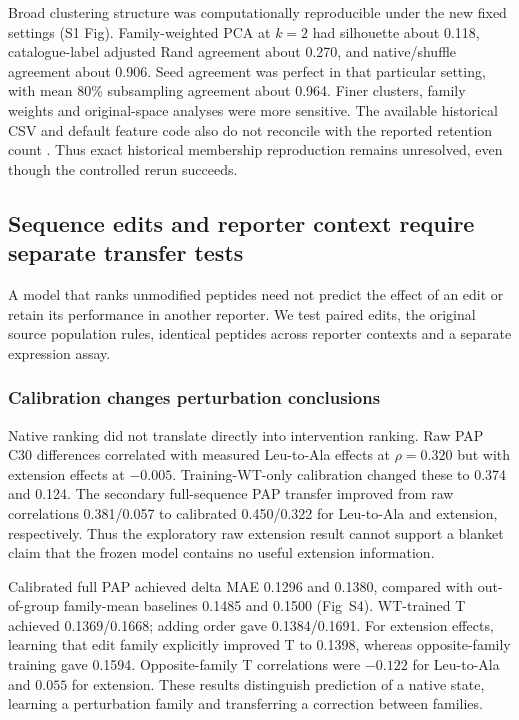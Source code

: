 \documentclass[11pt,a4paper]{article}
\begin{document}
Broad clustering structure was computationally reproducible under the new
fixed settings (S1 Fig). Family-weighted PCA at $k=2$ had
silhouette about 0.118, catalogue-label adjusted Rand agreement about 0.270,
and native/shuffle agreement about 0.906. Seed agreement was perfect in that
particular setting, with mean 80\% subsampling agreement about 0.964. Finer
clusters, family weights and original-space analyses were more sensitive.
The available historical CSV and default feature code also do not reconcile
with the reported retention count \cite{gounder}. Thus exact historical membership
reproduction remains unresolved, even though the controlled rerun succeeds.

\subsection{Sequence edits and reporter context require separate transfer tests}
A model that ranks unmodified peptides need not predict the effect of an edit or retain its performance in another reporter. We test paired edits, the original source population rules, identical peptides across reporter contexts and a separate expression assay.

\subsubsection{Calibration changes perturbation conclusions}
Native ranking did not translate directly into intervention ranking. Raw PAP
C30 differences correlated with measured Leu-to-Ala effects at $\rho=0.320$
but with extension effects at $-0.005$. Training-WT-only calibration changed
these to 0.374 and 0.124. The secondary full-sequence PAP transfer improved
from raw correlations 0.381/0.057 to calibrated 0.450/0.322 for Leu-to-Ala
and extension, respectively. Thus the exploratory raw extension result cannot
support a blanket claim that the frozen model contains no useful extension
information.

Calibrated full PAP achieved delta MAE 0.1296 and 0.1380, compared with
out-of-group family-mean baselines 0.1485 and 0.1500 (Fig~S4).
WT-trained T achieved 0.1369/0.1668; adding order gave 0.1384/0.1691.
For extension effects, learning that edit family explicitly improved T to
0.1398, whereas opposite-family training gave 0.1594. Opposite-family T
correlations were $-0.122$ for Leu-to-Ala and $0.055$ for extension. These
results distinguish prediction of a native state, learning a perturbation
family and transferring a correction between families.
\end{document}

